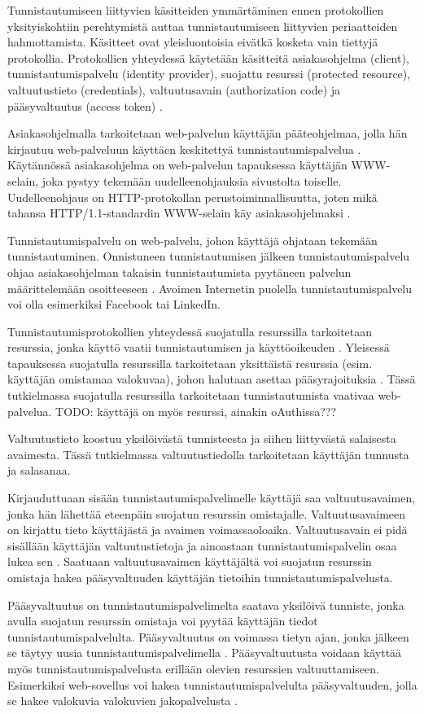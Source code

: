 Tunnistautumiseen liittyvien käsitteiden ymmärtäminen ennen protokollien yksityiskohtiin perehtymistä auttaa tunnistautumiseen liittyvien periaatteiden hahmottamista. Käsitteet ovat yleisluontoisia eivätkä kosketa vain tiettyjä protokollia. Protokollien yhteydessä käytetään käsitteitä asiakasohjelma (client), tunnistautumispalvelu (identity provider), suojattu resurssi (protected resource), valtuutustieto (credentials), valtuutusavain (authorization code) ja pääsyvaltuutus (access token) \cite{nisti}.

Asiakasohjelmalla tarkoitetaan web-palvelun käyttäjän pääteohjelmaa, jolla hän kirjautuu web-palveluun käyttäen keskitettyä tunnistautumispalvelua \cite{nisti}. Käytännössä asiakasohjelma on web-palvelun tapauksessa käyttäjän WWW-selain, joka pystyy tekemään uudelleenohjauksia sivustolta toiselle. Uudelleenohjaus on HTTP-pro\-to\-kol\-lan perustoiminnallisuutta, joten mikä tahansa HTTP/1.1-standardin WWW-selain käy asiakasohjelmaksi \cite{rfc2616}.

Tunnistautumispalvelu on web-palvelu, johon käyttäjä ohjataan tekemään tunnistautuminen. Onnistuneen tunnistautumisen jälkeen tunnistautumispalvelu ohjaa asi\-a\-kas\-oh\-jel\-man takaisin tunnistautumista pyytäneen palvelun määrittelemään osoitteeseen \cite{nisti}. Avoimen Internetin puolella tunnistautumispalvelu voi olla esimerkiksi Facebook tai LinkedIn.

Tunnistautumisprotokollien yhteydessä suojatulla resurssilla tarkoitetaan resurssia, jonka käyttö vaatii tunnistautumisen ja käyttöoikeuden \cite{oauth2_0}. Yleisessä tapauksessa suojatulla resurssilla tarkoitetaan yksittäistä resurssia (esim. käyttäjän omistamaa valokuvaa), johon halutaan asettaa pääsyrajoituksia \cite{nisti}. Tässä tutkielmassa suojatulla resurssilla tarkoitetaan tunnistautumista vaativaa web-palvelua. TODO: käyttäjä on myös resurssi, ainakin oAuthissa???

Valtuutustieto koostuu yksilöivästä tunnisteesta ja siihen liittyvästä salaisesta avaimesta. Tässä tutkielmassa valtuutustiedolla tarkoitetaan käyttäjän tunnusta ja salasanaa.

Kirjauduttuaan sisään tunnistautumispalvelimelle käyttäjä saa valtuutusavaimen, jonka hän lähettää eteenpäin suojatun resurssin omistajalle. Valtuutusavaimeen on kirjattu tieto käyttäjästä ja avaimen voimassaoloaika. Valtuutusavain ei pidä sisällään käyttäjän valtuutustietoja ja ainoastaan tunnistautumispalvelin osaa lukea sen \cite{nisti}. Saatuaan valtuutusavaimen käyttäjältä voi suojatun resurssin omistaja hakea pääsyvaltuuden käyttäjän tietoihin tunnistautumispalvelusta.

Pääsyvaltuutus on tunnistautumispalvelimelta saatava yksilöivä tunniste, jonka avulla suojatun resurssin omistaja voi pyytää käyttäjän tiedot tunnistautumispalvelulta. Pääsyvaltuutus on voimassa tietyn ajan, jonka jälkeen se täytyy uusia tunnistautumispalvelimella \cite{nisti}. Pääsyvaltuutusta voidaan käyttää myös tunnistautumispalvelusta erillään olevien resurssien valtuuttamiseen. Esimerkiksi web-sovellus voi hakea tunnistautumispalvelulta pääsyvaltuuden, jolla se hakee valokuvia valokuvien jakopalvelusta \cite{facebook}.